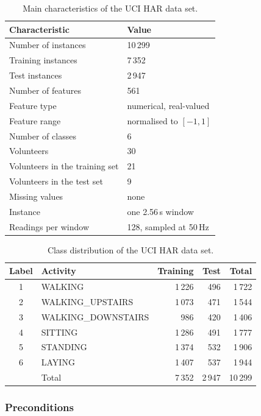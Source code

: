 \documentclass[a4paper, 11pt]{article}
\begin{document}
\begin{table}[h]
\centering
\caption{Main characteristics of the UCI HAR data set.}
\label{tab:data}
\begin{tabular}{ll}
\toprule
Characteristic & Value \\
\midrule
Number of instances & 10\,299 \\
Training instances & 7\,352 \\
Test instances & 2\,947 \\
Number of features & 561 \\
Feature type & numerical, real-valued \\
Feature range & normalised to $[-1, 1]$ \\
Number of classes & 6 \\
Volunteers & 30 \\
Volunteers in the training set & 21 \\
Volunteers in the test set & 9 \\
Missing values & none \\
Instance & one 2.56\,s window \\
Readings per window & 128, sampled at 50\,Hz \\
\bottomrule
\end{tabular}
\end{table}

\begin{table}[h]
\centering
\caption{Class distribution of the UCI HAR data set.}
\label{tab:classes}
\begin{tabular}{clrrr}
\toprule
Label & Activity & Training & Test & Total \\
\midrule
1 & WALKING & 1\,226 & 496 & 1\,722 \\
2 & WALKING\_UPSTAIRS & 1\,073 & 471 & 1\,544 \\
3 & WALKING\_DOWNSTAIRS & 986 & 420 & 1\,406 \\
4 & SITTING & 1\,286 & 491 & 1\,777 \\
5 & STANDING & 1\,374 & 532 & 1\,906 \\
6 & LAYING & 1\,407 & 537 & 1\,944 \\
\midrule
 & Total & 7\,352 & 2\,947 & 10\,299 \\
\bottomrule
\end{tabular}
\end{table}

\subsubsection{Preconditions}
\end{document}
